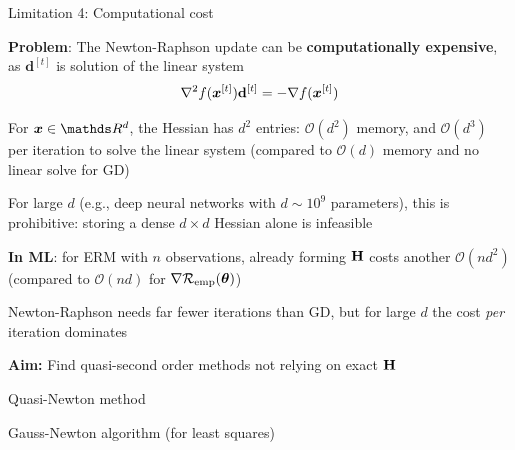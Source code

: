 \documentclass[11pt,compress,t,notes=noshow, xcolor=table]{beamer}
\begin{document}
\begin{framei}{Limitation 4: Computational cost}
\item \textbf{Problem}: The Newton-Raphson update can be \textbf{computationally expensive}, as $\mathbf{d}^{[t]}$ is solution of the linear system
$$
\nabla^2 f(\bm{x}^{[t]}) \mathbf{d}^{[t]} = - \nabla f(\bm{x}^{[t]})
$$
\item For $\xv \in \R^d$, the Hessian has $d^2$ entries: $\mathcal{O}(d^2)$ memory, and $\mathcal{O}(d^3)$ per iteration to solve the linear system (compared to $\mathcal{O}(d)$ memory and no linear solve for GD)
\item For large $d$ (e.g., deep neural networks with $d \sim 10^9$ parameters),
      this is prohibitive: storing a dense $d \times d$ Hessian alone is infeasible
\item \textbf{In ML}: for ERM with $n$ observations, already forming $\mathbf{H}$ costs another $\mathcal{O}(n d^2)$ (compared to $\mathcal{O}(nd)$ for $\nabla \mathcal{R}_{\text{emp}}(\bm{\theta})$)
\item Newton-Raphson needs far fewer iterations than GD, but for large $d$ the cost
\textit{per} iteration dominates
\item \textbf{Aim:} Find quasi-second order methods not relying on exact $\mathbf{H}$
\begin{itemizeS}
\item Quasi-Newton method
\item Gauss-Newton algorithm (for least squares)
\end{itemizeS}
\end{framei}

\endlecture
\end{document}
